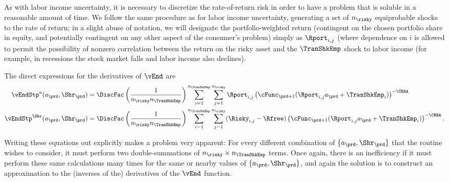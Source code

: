 \documentclass[\econtexRoot/SolvingMicroDSOPs]{subfiles}
\begin{document}
As with labor income uncertainty, it is necessary to discretize the rate-of-return risk in order to have a problem that is soluble in a reasonable amount of time.  We follow the same procedure as for labor income uncertainty, generating a set of $n_{\risky}$ equiprobable shocks to the rate of return; in a slight abuse of notation, we will designate the portfolio-weighted return (contingent on the chosen portfolio share in equity, and potentially contingent on any other aspect of the consumer's problem) simply as $\Rport_{i,j}$ (where dependence on $i$ is allowed to permit the possibility of nonzero correlation between the return on the risky asset and the $\TranShkEmp$ shock to labor income (for example, in recessions the stock market falls and labor income also declines).


The direct expressions for the derivatives of $\vEnd$ are
\begin{equation}\begin{gathered}\begin{aligned}
      \vEndStp^{a}(a_{\prd},\Shr_{\prd})  & = \DiscFac \left(\frac{1}{n_{\risky} n_{\TranShkEmp}}\right)\sum_{i=1}^{n_{\TranShkEmp}}\sum_{j=1}^{n_{\risky} }\Rport_{i,j} \left(\cFunc_{\prd+1}(\Rport_{i,j}a_{\prd}+\TranShkEmp_{i})\right)^{-\CRRA}
      \\      \vEndStp^{\Shr}(a_{\prd},\Shr_{\prd})  & = \DiscFac \left(\frac{1}{n_{\risky} n_{\TranShkEmp}}\right)\sum_{i=1}^{n_{\TranShkEmp}}\sum_{j=1}^{n_{\risky} }(\Risky_{i,j}-\Rfree)\left(\cFunc_{\prd+1}(\Rport_{i,j}a_{\prd}+\TranShkEmp_{i})\right)^{-\CRRA}.
    \end{aligned}\end{gathered}\end{equation}

Writing these equations out explicitly makes a problem very apparent: For every different combination of $\{{a}_{\prd},\Shr_{\prd}\}$ that the routine wishes to consider, it must perform two double-summations of $n_{\risky} \times n_{\TranShkEmp}$ terms.  Once again, there is an inefficiency if it must perform these same calculations many times for the same or nearby values of $\{{a}_{\prd},\Shr_{\prd}\}$, and again the solution is to construct an approximation to the (inverses of the) derivatives of the $\vEnd$ function.
\end{document}
